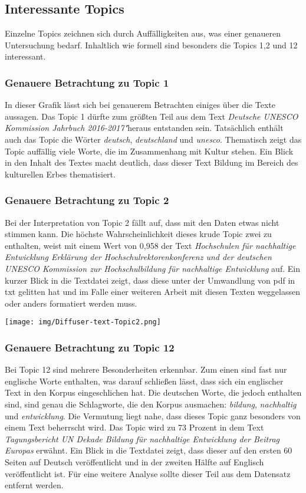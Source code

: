 \documentclass[letterpaper]{article}
\begin{document}
\subsection{Interessante Topics}
Einzelne Topics zeichnen sich durch Auffälligkeiten aus, was einer genaueren Untersuchung bedarf. Inhaltlich wie formell sind besonders die Topics 1,2 und 12 interessant.

\subsubsection{Genauere Betrachtung zu Topic 1}
In dieser Grafik lässt sich bei genauerem Betrachten einiges über die Texte aussagen. Das Topic 1 dürfte zum größten Teil aus dem Text \textit{Deutsche UNESCO Kommission Jahrbuch 2016-2017"}heraus entstanden sein. Tatsächlich enthält auch das Topic die Wörter \textit{deutsch}, \textit{deutschland} und \textit{unesco}. Thematisch zeigt das Topic auffällig viele Worte, die im Zusammenhang mit Kultur stehen. Ein Blick in den Inhalt des Textes macht deutlich, dass dieser Text Bildung im Bereich des kulturellen Erbes thematisiert. 

\subsubsection{Genauere Betrachtung zu Topic 2}
Bei der Interpretation von Topic 2 fällt auf, dass mit den Daten etwas nicht stimmen kann. 
Die höchste Wahrscheinlichkeit dieses krude Topic zwei zu enthalten, weist mit einem Wert von 0,958 der Text \textit{Hochschulen für nachhaltige Entwicklung Erklärung der Hochschulrektorenkonferenz und der deutschen UNESCO Kommission zur Hochschulbildung für nachhaltige Entwicklung} auf. Ein kurzer Blick in die Textdatei zeigt, dass diese unter der Umwandlung von pdf in txt gelitten hat und im Falle einer weiteren Arbeit mit diesen Texten weggelassen oder anders formatiert werden muss.

\texttt{[image: img/Diffuser-text-Topic2.png]}

\subsubsection{Genauere Betrachtung zu Topic 12}
Bei Topic 12 sind mehrere Besonderheiten erkennbar. Zum einen sind fast nur englische Worte enthalten, was darauf schließen lässt, dass sich ein englischer Text in den Korpus eingeschlichen hat. Die deutschen Worte, die jedoch enthalten sind, sind genau die Schlagworte, die den Korpus ausmachen: \textit{bildung}, \textit{nachhaltig} und \textit{entwicklung}. Die Vermutung liegt nahe, dass dieses Topic ganz besonders von einem Text beherrscht wird. Das Topic wird zu 73 Prozent in dem Text \textit{Tagungsbericht UN Dekade Bildung für nachhaltige Entwicklung der Beitrag Europas} erwähnt. Ein Blick in die Textdatei zeigt, dass dieser auf den ersten 60 Seiten auf Deutsch veröffentlicht und in der zweiten Hälfte auf Englisch veröffentlicht ist. Für eine weitere Analyse sollte dieser Teil aus dem Datensatz entfernt werden. 
\clearpage
\end{document}
